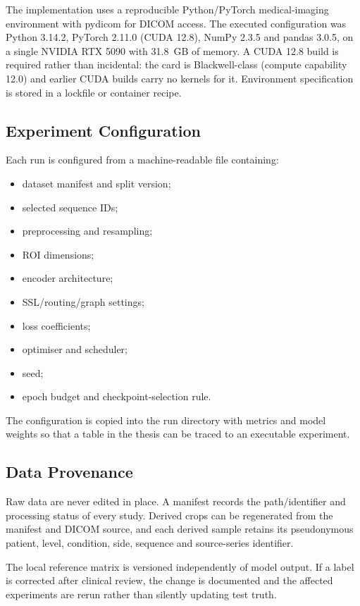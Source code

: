 The implementation uses a reproducible Python/PyTorch medical-imaging
environment with pydicom for DICOM access. The executed configuration was
Python 3.14.2, PyTorch 2.11.0 (CUDA 12.8), NumPy 2.3.5 and pandas 3.0.5, on a
single NVIDIA RTX 5090 with 31.8~GB of memory. A CUDA 12.8 build is required
rather than incidental: the card is Blackwell-class (compute capability 12.0)
and earlier CUDA builds carry no kernels for it. Environment specification is stored in a
lockfile or container recipe.

\subsection{Experiment Configuration}
\label{sec:method-config}

Each run is configured from a machine-readable file containing:

\begin{itemize}
  \item dataset manifest and split version;
  \item selected sequence IDs;
  \item preprocessing and resampling;
  \item ROI dimensions;
  \item encoder architecture;
  \item SSL/routing/graph settings;
  \item loss coefficients;
  \item optimiser and scheduler;
  \item seed;
  \item epoch budget and checkpoint-selection rule.
\end{itemize}

The configuration is copied into the run directory with metrics and model
weights so that a table in the thesis can be traced to an executable experiment.

\subsection{Data Provenance}
\label{sec:method-provenance}

Raw data are never edited in place. A manifest records the path/identifier and
processing status of every study. Derived crops can be regenerated from the
manifest and DICOM source, and each derived sample retains its pseudonymous
patient, level, condition, side, sequence and source-series identifier.

The local reference matrix is versioned independently of model output. If a
label is corrected after clinical review, the change is documented and the
affected experiments are rerun rather than silently updating test truth.


